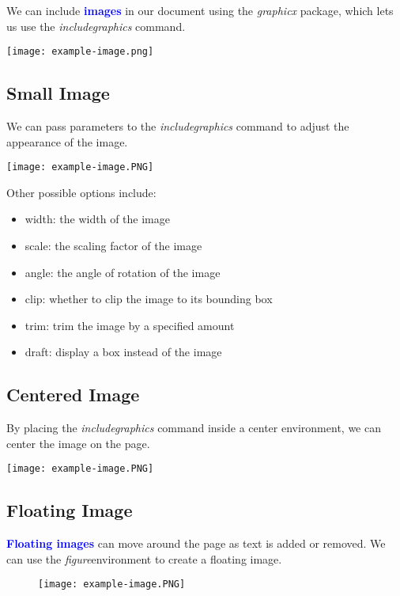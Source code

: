 \documentclass{article}
\newcommand{\kw}[1]{\textcolor{blue}{\textbf{#1}}}
\newcommand{\cmd}[1]{\textit{#1}}
\begin{document}
We can include \kw{images} in our document using the \cmd{graphicx} package, which lets us use the
\cmd{includegraphics} command.

\texttt{[image: example-image.png]}

\subsection{Small Image}

We can pass parameters to the \cmd{includegraphics} command to adjust the appearance of the image.

\texttt{[image: example-image.PNG]}

Other possible options include:

\begin{itemize}
  \item width: the width of the image
  \item scale: the scaling factor of the image
  \item angle: the angle of rotation of the image
  \item clip: whether to clip the image to its bounding box
  \item trim: trim the image by a specified amount
  \item draft: display a box instead of the image
\end{itemize}

\subsection{Centered Image}

By placing the \cmd{includegraphics} command inside a center environment, we can center the
image on the page.

\begin{center}
  \texttt{[image: example-image.PNG]}
\end{center}

\subsection{Floating Image}

\kw{Floating images} can move around the page as text is added or removed. We can use the
\cmd{figure}environment to create a floating image.

\begin{figure}[ht]
  \centering
  \texttt{[image: example-image.PNG]}
\end{figure}
\end{document}
